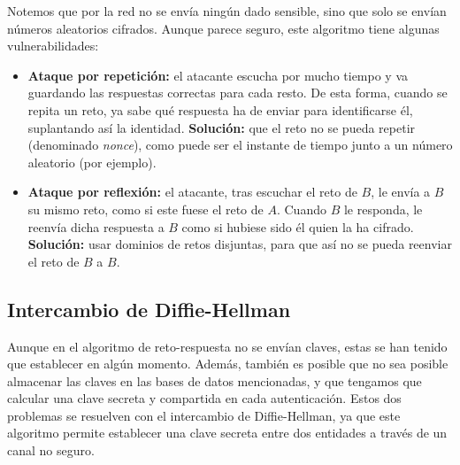 Notemos que por la red no se envía ningún dado sensible, sino que solo se envían números aleatorios cifrados. Aunque parece seguro, este algoritmo tiene algunas vulnerabilidades:
\begin{itemize}
    \item \textbf{Ataque por repetición:} el atacante escucha por mucho tiempo y va guardando las respuestas correctas para cada resto. De esta forma, cuando se repita un reto, ya sabe qué respuesta ha de enviar para identificarse él, suplantando así la identidad. \textbf{Solución:} que el reto no se pueda repetir (denominado \emph{nonce}), como puede ser el instante de tiempo junto a un número aleatorio (por ejemplo).
    \item \textbf{Ataque por reflexión:} el atacante, tras escuchar el reto de $B$, le envía a $B$ su mismo reto, como si este fuese el reto de $A$. Cuando $B$ le responda, le reenvía dicha respuesta a $B$ como si hubiese sido él quien la ha cifrado. \textbf{Solución:} usar dominios de retos disjuntas, para que así no se pueda reenviar el reto de $B$ a $B$.
\end{itemize}

\subsection{Intercambio de Diffie-Hellman}

Aunque en el algoritmo de reto-respuesta no se envían claves, estas se han tenido que establecer en algún momento.
Además, también es posible que no sea posible almacenar las claves en las bases de datos mencionadas, y que tengamos que calcular una clave secreta y compartida en cada autenticación. Estos dos problemas se resuelven con el intercambio de Diffie-Hellman, ya que este algoritmo permite establecer una clave secreta entre dos entidades a través de un canal no seguro.

